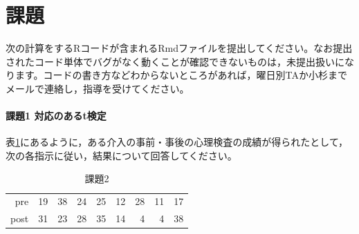 \documentclass{ltjsbook}
\begin{document}
\section{課題}
次の計算をするRコードが含まれるRmdファイルを提出してください。なお提出されたコード単体でバグがなく動くことが確認できないものは，未提出扱いになります。コードの書き方などわからないところがあれば，曜日別TAか小杉までメールで連絡し，指導を受けてください。

\paragraph{課題1 対応のあるt検定}
表\ref{exe:20_2}にあるように，ある介入の事前・事後の心理検査の成績が得られたとして，次の各指示に従い，結果について回答してください。
\begin{table}[ht]
	\centering
	\caption{課題2}
	\label{exe:20_2}
	\begin{tabular}{rrrrrrrrr}
		\hline
		pre  & 19 & 38 & 24 & 25 & 12 & 28 & 11 & 17 \\
		post & 31 & 23 & 28 & 35 & 14 & 4  & 4  & 38 \\
		\hline
	\end{tabular}
\end{table}
\end{document}
